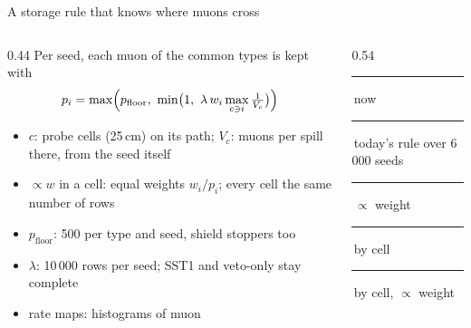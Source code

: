 \documentclass[aspectratio=169,10pt]{beamer}
\newcommand{\legendline}[1]{{\color{muted}\lightfont\scriptsize #1}}
\newcommand{\sw}[1]{\textcolor[HTML]{#1}{\rule{1.1ex}{1.1ex}}}
\begin{document}
\begin{frame}{A storage rule that knows where muons cross}
  \begin{columns}[c]
    \begin{column}{0.44\textwidth}\scriptsize
      Per seed, each muon of the common types is kept with
      \[ p_i = \max\Bigl(p_\text{floor},\ \min\bigl(1,\ \lambda\, w_i \max_{c \ni i} \tfrac{1}{V_c}\bigr)\Bigr) \]
      \vspace{-3mm}
      \begin{itemize}\scriptsize
        \item $c$: probe cells (25\,cm) on its path; $V_c$: muons per spill there, from the seed itself
        \item $\propto w$ in a cell: equal weights $w_i/p_i$; every cell the same number of rows
        \item $p_\text{floor}$: 500 per type and seed, shield stoppers too
        \item $\lambda$: 10\,000 rows per seed; SST1 and veto-only stay complete
        \item rate maps: histograms of  muon
      \end{itemize}
    \end{column}
    \begin{column}{0.54\textwidth}
      \\[0.5mm]
      \legendline{\sw{2a78d6}\,now \sw{eb6834}\,today's rule over 6\,000 seeds \sw{1baf7a}\,$\propto$ weight \sw{eda100}\,by cell \sw{e87ba4}\,by cell, $\propto$ weight}\\[0.5mm]
    \end{column}
  \end{columns}
\end{frame}
\end{document}
